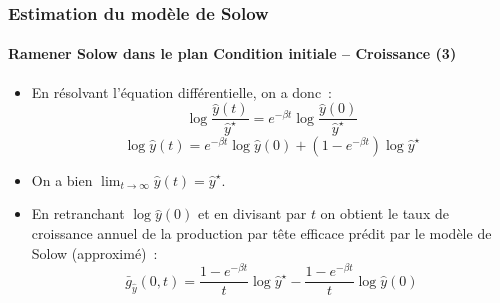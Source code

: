 \documentclass[10pt,notheorems]{beamer}
\theoremstyle{plain}
\theoremstyle{definition} %
\begin{document}
\begin{frame}
  \frametitle{Estimation du modèle de Solow}
  \framesubtitle{Ramener Solow dans le plan Condition initiale -- Croissance (3)}

  \begin{itemize}

  \item En résolvant l'équation différentielle, on a donc~:
    \[
      \log \frac{\hat y(t)}{\hat y^{\star}} = e^{-\beta t}\log \frac{\hat y(0)}{\hat y^{\star}}
    \]
    \[
      \log \hat y(t) = e^{-\beta t} \log \hat y(0) + \left(1-e^{-\beta t}\right)\log \hat y^{\star}
    \]

    \medskip

  \item On a bien $\lim_{t\rightarrow\infty}\hat y(t) = \hat y^{\star}$.\newline

  \item En retranchant $\log \hat y(0)$ et en divisant par $t$ on obtient le taux de croissance annuel de la production par tête efficace prédit par le modèle de Solow (approximé)~:
    \[
      \bar g_{\hat y}(0,t) = \frac{1-e^{-\beta t}}{t}\log \hat y^{\star} - \frac{1-e^{-\beta t}}{t}\log \hat y(0)
    \]
  \end{itemize}

\end{frame}
\end{document}
